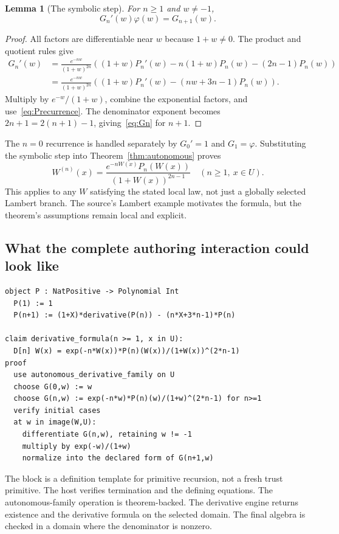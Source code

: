 \documentclass[11pt,a4paper]{article}
\newcommand{\code}[1]{\texttt{\detokenize{#1}}}
\newtheorem{lemma}[proposition]{Lemma}
\theoremstyle{definition}
\theoremstyle{remark}
\begin{document}
\begin{lemma}[The symbolic step]\label{lem:symbolic}
For $n\ge1$ and $w\ne-1$,
\[
G_n'(w)\varphi(w)=G_{n+1}(w).
\]
\end{lemma}
\begin{proof}
All factors are differentiable near $w$ because $1+w\ne0$. The product and quotient rules give
\begin{align*}
G_n'(w)
 &=\frac{e^{-nw}}{(1+w)^{2n}}
 \left((1+w)P_n'(w)-n(1+w)P_n(w)-(2n-1)P_n(w)\right)\\
 &=\frac{e^{-nw}}{(1+w)^{2n}}
 \left((1+w)P_n'(w)-(nw+3n-1)P_n(w)\right).
\end{align*}
Multiply by $e^{-w}/(1+w)$, combine the exponential factors, and use~\eqref{eq:Precurrence}. The denominator exponent becomes $2n+1=2(n+1)-1$, giving~\eqref{eq:Gn} for $n+1$.
\end{proof}
The $n=0$ recurrence is handled separately by $G_0'=1$ and $G_1=\varphi$. Substituting the symbolic step into Theorem~\ref{thm:autonomous} proves
\begin{equation}\label{eq:Wnth}
W^{(n)}(x)=\frac{e^{-nW(x)}P_n(W(x))}{(1+W(x))^{2n-1}}
\quad(n\ge1,\ x\in U).
\end{equation}
This applies to any $W$ satisfying the stated local law, not just a globally selected Lambert branch. The source's Lambert example motivates the formula, but the theorem's assumptions remain local and explicit.

\subsection{What the complete authoring interaction could look like}
\begin{lstlisting}
object P : NatPositive -> Polynomial Int
  P(1) := 1
  P(n+1) := (1+X)*derivative(P(n)) - (n*X+3*n-1)*P(n)

claim derivative_formula(n >= 1, x in U):
  D[n] W(x) = exp(-n*W(x))*P(n)(W(x))/(1+W(x))^(2*n-1)
proof
  use autonomous_derivative_family on U
  choose G(0,w) := w
  choose G(n,w) := exp(-n*w)*P(n)(w)/(1+w)^(2*n-1) for n>=1
  verify initial cases
  at w in image(W,U):
    differentiate G(n,w), retaining w != -1
    multiply by exp(-w)/(1+w)
    normalize into the declared form of G(n+1,w)
\end{lstlisting}
The \code{object} block is a definition template for primitive recursion, not a fresh trust primitive. The host verifies termination and the defining equations. The autonomous-family operation is theorem-backed. The derivative engine returns existence and the derivative formula on the selected domain. The final algebra is checked in a domain where the denominator is nonzero.
\end{document}

